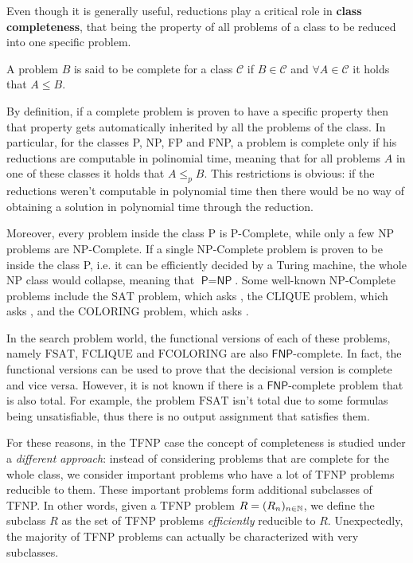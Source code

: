 Even though it is generally useful, reductions play a critical role in \textbf{class completeness}, that being the property of all problems of a class to be reduced into one specific problem. 

\begin{definition}
    A problem $B$ is said to be complete for a class $\mathcal{C}$ if $B \in \mathcal{C}$ and $\forall A \in \mathcal{C}$ it holds that $A \leq B$.
\end{definition}

By definition, if a complete problem is proven to have a specific property then that property gets automatically inherited by all the problems of the class. In particular, for the classes \textsf{P}, \textsf{NP}, \textsf{FP} and \textsf{FNP}, a problem is complete only if his reductions are computable in polinomial time, meaning that for all problems $A$ in one of these classes it holds that $A \leq_p B$. This restrictions is obvious: if the reductions weren't computable in polynomial time then there would be no way of obtaining a solution in polynomial time through the reduction.

Moreover, every problem inside the class \textsf{P} is \textsf{P}-Complete, while only a few \textsf{NP} problems are \textsf{NP}-Complete. If a single \textsf{NP}-Complete problem is proven to be inside the class \textsf{P}, i.e. it can be efficiently decided by a Turing machine, the whole \textsf{NP} class would collapse, meaning that $\textsf{P} = \textsf{NP}$. Some well-known \textsf{NP}-Complete problems include the $\mathrm{SAT}$ problem, which asks , the $\mathrm{CLIQUE}$ problem, which asks , and the $\mathrm{COLORING}$ problem, which asks .

In the search problem world, the functional versions of each of these problems, namely $\mathrm{FSAT}$, $\mathrm{FCLIQUE}$ and $\mathrm{FCOLORING}$ are also $\textsf{FNP}$-complete. In fact, the functional versions can be used to prove that the decisional version is complete and vice versa. However, it is not known if there is a $\textsf{FNP}$-complete problem that is also total. For example, the problem $\mathrm{FSAT}$ isn't total due to some formulas being unsatisfiable, thus there is no output assignment that satisfies them.

For these reasons, in the \textsf{TFNP} case the concept of completeness is studied under a \textit{different approach}: instead of considering problems that are complete for the whole class, we consider important problems who have a lot of \textsf{TFNP} problems reducible to them. These important problems form additional subclasses of \textsf{TFNP}. In other words, given a \textsf{TFNP} problem $R = (R_n)_{n \in \mathbb{N}}$, we define the subclass $R$ as the set of \textsf{TFNP} problems \textit{efficiently} reducible to $R$. Unexpectedly, the majority of \textsf{TFNP} problems can actually be characterized with very subclasses.

